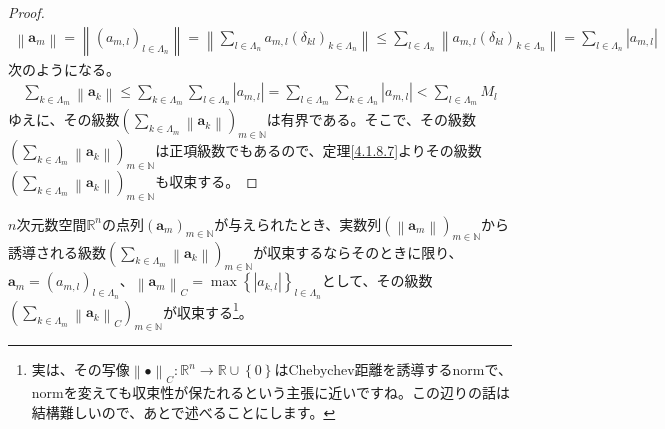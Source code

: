 \documentclass[dvipdfmx]{jsarticle}
\begin{document}
\begin{proof}
\begin{align*}
\left\| \mathbf{a}_{m} \right\| = \left\| \left( a_{m,l} \right)_{l \in \varLambda_{n}} \right\| = \left\| \sum_{l \in \varLambda_{n}} {a_{m,l}\left( \delta_{kl} \right)_{k \in \varLambda_{n}}} \right\| \leq \sum_{l \in \varLambda_{n}} \left\| a_{m,l}\left( \delta_{kl} \right)_{k \in \varLambda_{n}} \right\| = \sum_{l \in \varLambda_{n}} \left| a_{m,l} \right|
\end{align*}
次のようになる。
\begin{align*}
\sum_{k \in \varLambda_{m}} \left\| \mathbf{a}_{k} \right\| \leq \sum_{k \in \varLambda_{m}} {\sum_{l \in \varLambda_{n}} \left| a_{m,l} \right|} = \sum_{l \in \varLambda_{m}} {\sum_{k \in \varLambda_{n}} \left| a_{m,l} \right|} < \sum_{l \in \varLambda_{m}} M_{l}
\end{align*}
ゆえに、その級数$\left( \sum_{k \in \varLambda_{m}} \left\| \mathbf{a}_{k} \right\| \right)_{m \in \mathbb{N}}$は有界である。そこで、その級数$\left( \sum_{k \in \varLambda_{m}} \left\| \mathbf{a}_{k} \right\| \right)_{m \in \mathbb{N}}$は正項級数でもあるので、定理\ref{4.1.8.7}よりその級数$\left( \sum_{k \in \varLambda_{m}} \left\| \mathbf{a}_{k} \right\| \right)_{m \in \mathbb{N}}$も収束する。
\end{proof}
\begin{thm}\label{4.1.8.15}
$n$次元数空間$\mathbb{R}^{n}$の点列$\left( \mathbf{a}_{m} \right)_{m \in \mathbb{N}}$が与えられたとき、実数列$\left( \left\| \mathbf{a}_{m} \right\| \right)_{m \in \mathbb{N}}$から誘導される級数$\left( \sum_{k \in \varLambda_{m}} \left\| \mathbf{a}_{k} \right\| \right)_{m \in \mathbb{N}}$が収束するならそのときに限り、$\mathbf{a}_{m} = \left( a_{m,l} \right)_{l \in \varLambda_{n}}$、$\left\| \mathbf{a}_{m} \right\|_{C} = \max\left\{ \left| a_{k,l} \right| \right\}_{l \in \varLambda_{n}}$として、その級数$\left( \sum_{k \in \varLambda_{m}} \left\| \mathbf{a}_{k} \right\|_{C} \right)_{m \in \mathbb{N}}$が収束する\footnote{実は、その写像$\left\| \bullet \right\|_{C}:\mathbb{R}^{n} \rightarrow \mathbb{R} \cup \left\{ 0 \right\}$はChebychev距離を誘導するnormで、normを変えても収束性が保たれるという主張に近いですね。この辺りの話は結構難しいので、あとで述べることにします。}。
\end{thm}
\end{document}
